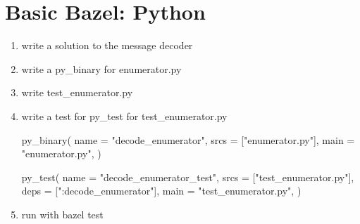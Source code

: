 \documentclass{article}
\begin{document}
\section{Basic Bazel: Python}
\begin{enumerate}
    \item write a solution to the message decoder
    \item write a py\_binary for enumerator.py
    \item write test\_enumerator.py
    \item write a test for py\_test for test\_enumerator.py
\begin{bazel}
py_binary(
    name = "decode_enumerator",
    srcs = ["enumerator.py"],
    main = "enumerator.py",
)

py_test(
    name = "decode_enumerator_test",
    srcs = ["test_enumerator.py"],
    deps = [":decode_enumerator"],
    main = "test_enumerator.py",
)
\end{bazel}
    \item run with bazel test
\end{enumerate}
\end{document}
